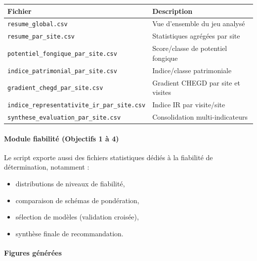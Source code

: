 {\def\LTcaptype{none} %
\begin{longtable}[]{@{}
  >{\raggedright\arraybackslash}p{}
  >{\raggedright\arraybackslash}p{}@{}}
\toprule\noalign{}
\begin{minipage}[b]{\linewidth}\raggedright
Fichier
\end{minipage} & \begin{minipage}[b]{\linewidth}\raggedright
Description
\end{minipage} \\
\midrule\noalign{}
\endhead
\bottomrule\noalign{}
\endlastfoot
\texttt{resume\_global.csv} & Vue d'ensemble du jeu analysé \\
\texttt{resume\_par\_site.csv} & Statistiques agrégées par site \\
\texttt{potentiel\_fongique\_par\_site.csv} & Score/classe de potentiel
fongique \\
\texttt{indice\_patrimonial\_par\_site.csv} & Indice/classe
patrimoniale \\
\texttt{gradient\_chegd\_par\_site.csv} & Gradient CHEGD par site et
visites \\
\texttt{indice\_representativite\_ir\_par\_site.csv} & Indice IR par
visite/site \\
\texttt{synthese\_evaluation\_par\_site.csv} & Consolidation
multi-indicateurs \\
\end{longtable}
}

\paragraph{Module fiabilité (Objectifs 1 à
4)}\label{module-fiabilituxe9-objectifs-1-uxe0-4}

Le script exporte aussi des fichiers statistiques dédiés à la fiabilité
de détermination, notamment :

\begin{itemize}
\tightlist
\item
  distributions de niveaux de fiabilité,
\item
  comparaison de schémas de pondération,
\item
  sélection de modèles (validation croisée),
\item
  synthèse finale de recommandation.
\end{itemize}

\paragraph{Figures générées}\label{figures-guxe9nuxe9ruxe9es}

